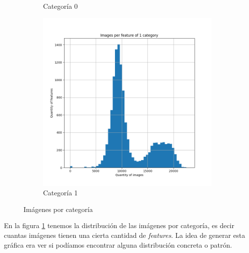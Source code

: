 \documentclass[12,twoside]{TFG-GM}
\theoremstyle{definition}
\theoremstyle{remark}
\begin{document}
\begin{figure}[ht]
\begin{subfigure}[b]{0.3\textwidth}
		\caption{Categoría 0}
	\end{subfigure}
	\begin{subfigure}[b]{0.3\textwidth}
		\includegraphics[width=\textwidth]  {Images/plots/25/Images_per_feature_of_1_category.png}
		\caption{Categoría 1}
	\end{subfigure}       
	\caption{Imágenes por categoría \label{fig:imagesperfeature}}
\end{figure}

En la figura \ref{fig:imagesperfeature} tenemos la distribución de las imágenes por categoría, es decir cuantas imágenes tienen una cierta cantidad de \textit{features}. La idea de generar esta gráfica era ver si podíamos encontrar alguna distribución concreta o patrón. %
\end{document}
